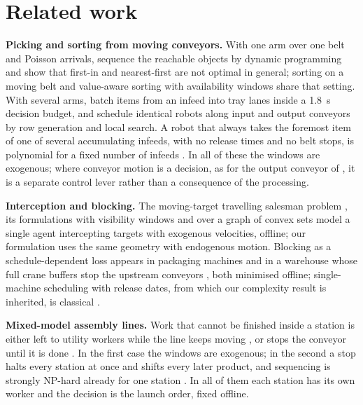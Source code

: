 \documentclass[11pt,a4paper]{article}
\theoremstyle{plain}
\theoremstyle{definition}
\theoremstyle{remark}
\begin{document}
\section{Related work}\label{sec:related}
\textbf{Picking and sorting from moving conveyors.} With one arm over one belt and Poisson
arrivals, \cite{S02_Han2020} sequence the reachable objects by dynamic programming and show
that first-in and nearest-first are not optimal in general; sorting on a moving belt
\cite{S01_Mattone2000} and value-aware sorting with availability windows
\cite{S05_Kokkalis2026} share that setting. With several arms, \cite{S03_Nielsen2023} batch
items from an infeed into tray lanes inside a 1.8~s decision budget, and
\cite{S04_Schettini2023} schedule identical robots along input and output conveyors by row
generation and local search. A robot that always takes the foremost item of one of several
accumulating infeeds, with no release times and no belt stops, is polynomial for a fixed
number of infeeds \cite{Li2026}. In all of these the windows are exogenous; where conveyor
motion is a decision, as for the output conveyor of \cite{S04_Schettini2023}, it is a
separate control lever rather than a consequence of the processing.

\textbf{Interception and blocking.} The moving-target travelling salesman problem
\cite{S06_Helvig2003}, its formulations with visibility windows \cite{S07_Stieber2022} and
over a graph of convex sets \cite{S08_Philip2024} model a single agent intercepting targets
with exogenous velocities, offline; our formulation uses the same geometry with endogenous
motion. Blocking as a schedule-dependent loss appears in packaging machines
\cite{S10_Briskorn2025} and in a warehouse whose full crane buffers stop the upstream
conveyors \cite{S11_SalviaHornos2026}, both minimised offline; single-machine scheduling
with release dates, from which our complexity result is inherited, is classical
\cite{Lenstra1977,Schrage1968,Baker1974}.

\textbf{Mixed-model assembly lines.} Work that cannot be finished inside a station is
either left to utility workers while the line keeps moving \cite{Yano1991,Tsai1995,Sarker2001},
or stops the conveyor until it is done \cite{Xiaobo2000,Tamura2011}. In the first case the
windows are exogenous; in the second a stop halts every station at once and shifts every
later product, and sequencing is strongly NP-hard already for one station
\cite{Tsai1995,Xiaobo2000}. In all of them each station has its own worker and the decision
is the launch order, fixed offline.
\end{document}
